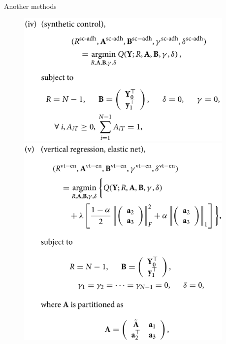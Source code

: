 \documentclass[xcolor=svgnames,aspectratio=169]{beamer}
\begin{document}
\begin{frame}{Another methods}
    \begin{figure}[h]
  \centering
  \begin{minipage}{0.43\columnwidth}
    \centering
    \includegraphics[width=0.95\textwidth, height=0.95\textheight, keepaspectratio]{SC.png}
  \end{minipage}
  \hspace{5mm}
  \begin{minipage}{0.43\columnwidth}
    \centering
    \includegraphics[width=0.95\textwidth, height=0.95\textheight, keepaspectratio]{Vt_EN.png}
  \end{minipage}
  \end{figure}
\end{frame}
\end{document}
